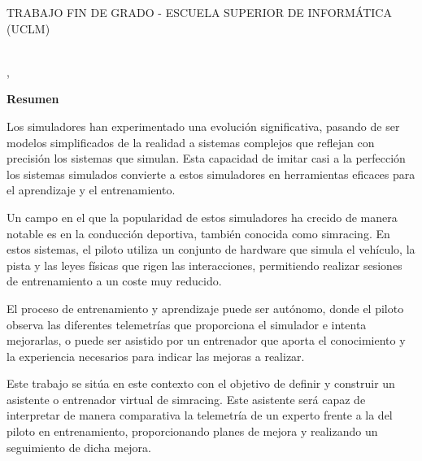 \pagestyle{plain}	%

%
% 
%

\makeatletter
\begin{center} %
   {\textsc{TRABAJO FIN DE GRADO - ESCUELA SUPERIOR DE INFORMÁTICA 
   (UCLM)}\par} %
   \vspace{1cm} %
   {\textbf{\Large\@tituloCorto}\par}  %
   \vspace{0.4cm} %
   {\@autor \\ \@cityTF,{} \@mesTF{} \@yearTF\par} 
   \vspace{0.9cm} %
   {\textbf{\large\textsf{Resumen}}\par} %
\end{center}   
\makeatother %

Los simuladores han experimentado una evolución significativa, pasando de ser modelos simplificados de la realidad a sistemas complejos que reflejan con precisión los sistemas que simulan. Esta capacidad de imitar casi a la perfección los sistemas simulados convierte a estos simuladores en herramientas eficaces para el aprendizaje y el entrenamiento.

Un campo en el que la popularidad de estos simuladores ha crecido de manera notable es en la conducción deportiva, también conocida como simracing. En estos sistemas, el piloto utiliza un conjunto de hardware que simula el vehículo, la pista y las leyes físicas que rigen las interacciones, permitiendo realizar sesiones de entrenamiento a un coste muy reducido.

El proceso de entrenamiento y aprendizaje puede ser autónomo, donde el piloto observa las diferentes telemetrías que proporciona el simulador e intenta mejorarlas, o puede ser asistido por un entrenador que aporta el conocimiento y la experiencia necesarios para indicar las mejoras a realizar.

Este trabajo se sitúa en este contexto con el objetivo de definir y construir un asistente o entrenador virtual de simracing. Este asistente será capaz de interpretar de manera comparativa la telemetría de un experto frente a la del piloto en entrenamiento, proporcionando planes de mejora y realizando un seguimiento de dicha mejora.


